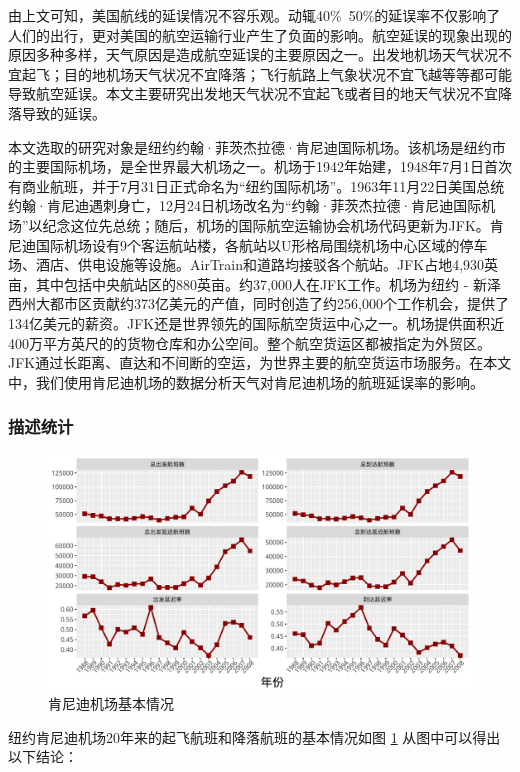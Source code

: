\documentclass[12pt,a4paper,onecolumn]{article}
\begin{document}
由上文可知，美国航线的延误情况不容乐观。动辄40\%~50\%的延误率不仅影响了人们的出行，更对美国的航空运输行业产生了负面的影响。航空延误的现象出现的原因多种多样，天气原因是造成航空延误的主要原因之一。出发地机场天气状况不宜起飞；目的地机场天气状况不宜降落；飞行航路上气象状况不宜飞越等等都可能导致航空延误。本文主要研究出发地天气状况不宜起飞或者目的地天气状况不宜降落导致的延误。

本文选取的研究对象是纽约约翰·菲茨杰拉德·肯尼迪国际机场。该机场是纽约市的主要国际机场，是全世界最大机场之一。机场于1942年始建，1948年7月1日首次有商业航班，并于7月31日正式命名为“纽约国际机场”。1963年11月22日美国总统约翰·肯尼迪遇刺身亡，12月24日机场改名为“约翰·菲茨杰拉德·肯尼迪国际机场”以纪念这位先总统；随后，机场的国际航空运输协会机场代码更新为JFK。肯尼迪国际机场设有9个客运航站楼，各航站以U形格局围绕机场中心区域的停车场、酒店、供电设施等设施。AirTrain和道路均接驳各个航站。JFK占地4,930英亩，其中包括中央航站区的880英亩。约37,000人在JFK工作。机场为纽约 - 新泽西州大都市区贡献约373亿美元的产值，同时创造了约256,000个工作机会，提供了134亿美元的薪资。JFK还是世界领先的国际航空货运中心之一。机场提供面积近400万平方英尺的的货物仓库和办公空间。整个航空货运区都被指定为外贸区。 JFK通过长距离、直达和不间断的空运，为世界主要的航空货运市场服务。在本文中，我们使用肯尼迪机场的数据分析天气对肯尼迪机场的航班延误率的影响。

\subsubsection{描述统计}

\begin{figure}[H]
	\centering
	\includegraphics[width=400pt]{图5_肯尼迪机场描述统计.pdf}
	\caption{肯尼迪机场基本情况}
  \label{图5_肯尼迪机场描述统计}
\end{figure}

纽约肯尼迪机场20年来的起飞航班和降落航班的基本情况如图 \ref{图5_肯尼迪机场描述统计} 从图中可以得出以下结论：
\end{document}
